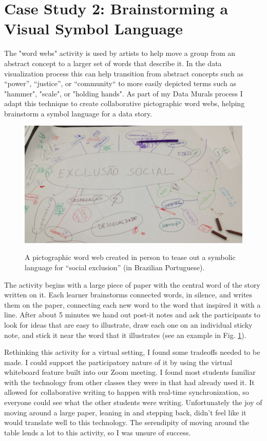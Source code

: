\documentclass[journal]{vgtc}                %
\begin{document}
\section{Case Study 2: Brainstorming a Visual Symbol Language}
The "word webs" activity is used by artists to help move a group from an abstract concept to a larger set of words that describe it. In the data visualization process this can help transition from abstract concepts such as “power”, “justice”, or “community“ to more easily depicted terms such as "hammer", "scale", or "holding hands". As part of my Data Murals process I adapt this technique to create collaborative pictographic word webs, helping brainstorm a symbol language for a data story\cite{bhargava_data_2016}.

\begin{figure}[h]
  \centering
  \includegraphics[scale=0.26]{figures/figure2.jpg}
  \label{fig:full_word_web}
  \caption{A pictographic word web created in person to tease out a symbolic language for “social exclusion” (in Brazilian Portuguese).}
\end{figure}

The activity begins with a large piece of paper with the central word of the story written on it. Each learner brainstorms connected words, in silence, and writes them on the paper, connecting each new word to the word that inspired it with a line. After about 5 minutes we hand out post-it notes and ask the participants to look for ideas that are easy to illustrate, draw each one on an individual sticky note, and stick it near the word that it illustrates (see an example in Fig. \ref{fig:full_word_web}).

Rethinking this activity for a virtual setting, I found some tradeoffs needed to be made. I could support the participatory nature of it by using the virtual whiteboard feature built into our Zoom meeting. I found most students familiar with the technology from other classes they were in that had already used it. It allowed for collaborative writing to happen with real-time synchronization, so everyone could see what the other students were writing. Unfortunately the joy of moving around a large paper, leaning in and stepping back, didn't feel like it would translate well to this technology. The serendipity of moving around the table lends a lot to this activity, so I was unsure of success.
\end{document}
